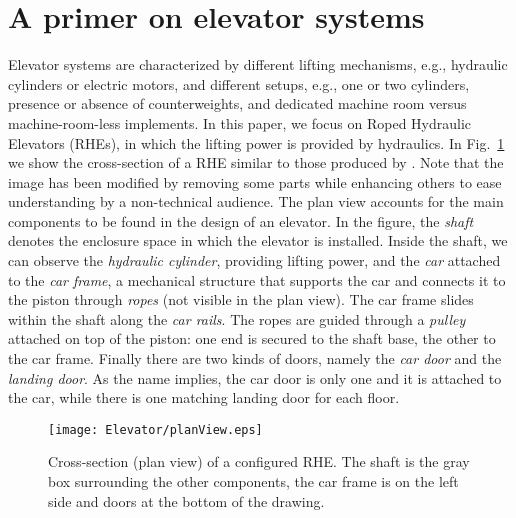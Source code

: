 \section{A primer on elevator systems}
\label{sec:elevators}

Elevator systems are characterized by different lifting mechanisms, 
e.g., hydraulic cylinders or electric motors, and different setups,
e.g., one or two cylinders, presence or absence of counterweights, and
dedicated machine room versus machine-room-less implements. In this
paper, we focus on Roped Hydraulic Elevators (RHEs), in which the
lifting power is provided by hydraulics. In Fig.~\ref{img:planView}
we show the cross-section of a RHE similar to those produced by
\liftcreate{}. Note that the image has been modified by removing 
some parts while enhancing others to ease understanding by a 
non-technical audience. The plan view accounts for the main components 
to be found in the design of an elevator. In the figure, the 
\textit{shaft} denotes the enclosure space in which the elevator 
is installed. Inside the shaft, we can observe the \textit{hydraulic
	cylinder}, providing lifting power, and  the \textit{car} attached
to the \textit{car frame}, a mechanical structure that supports the 
car and connects it to the piston through \emph{ropes} (not visible
in the plan view).  
The car frame slides within the shaft along the \textit{car rails}. 
The ropes are guided through a \textit{pulley} attached on top of the
piston: one end is secured to the shaft base, the other to the car frame.
Finally there are two kinds of doors, namely the \textit{car door} and
the  \textit{landing door}. As the name implies, the car door is only
one and it is attached to the car, while there is one matching landing
door for each floor.

\begin{figure}[t!]
	\caption{\label{img:planView} Cross-section (plan view) of a
		configured RHE. The shaft is the gray box surrounding the
		other components, the car frame is on the left side and
		doors at the bottom of the drawing.}
	\centering \texttt{[image: Elevator/planView.eps]}
\end{figure}

